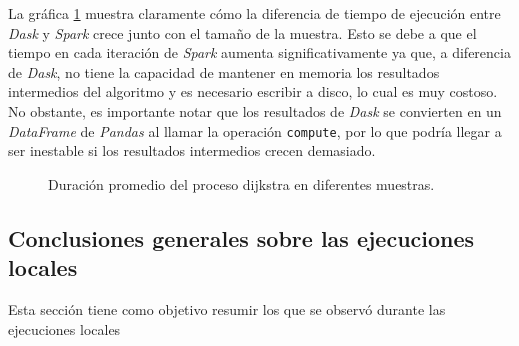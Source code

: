 La gráfica \ref{lineas:local-dijkstra} muestra claramente cómo la diferencia de tiempo de ejecución entre \textit{Dask} y \textit{Spark} crece junto con el tamaño de la muestra. Esto se debe a que el tiempo en cada iteración de \textit{Spark} aumenta significativamente ya que, a diferencia de \textit{Dask}, no tiene la capacidad de mantener en memoria los resultados intermedios del algoritmo y es necesario escribir a disco, lo cual es muy costoso. No obstante, es importante notar que los resultados de \textit{Dask} se convierten en un \textit{DataFrame} de \textit{Pandas} al llamar la operación \texttt{compute}, por lo que podría llegar a ser inestable si los resultados intermedios crecen demasiado.

\begin{figure}
\centering
{}
\caption{Duración promedio del proceso dijkstra en diferentes muestras.}
\label{lineas:local-dijkstra}
\end{figure}

\subsection{Conclusiones generales sobre las ejecuciones locales}

Esta sección tiene como objetivo resumir los que se observó durante las ejecuciones locales 


